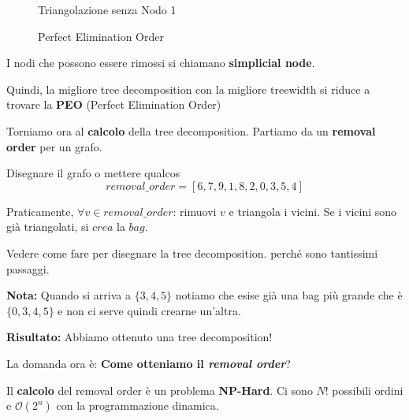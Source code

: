 \begin{definition}
\begin{figure}[H]
\begin{center}
        \end{center}
        \caption{Triangolazione senza Nodo 1}
    \end{figure}

    \begin{figure}[H]
        \begin{center}
        \end{center}
        \caption{Perfect Elimination Order}
    \end{figure}

    I nodi che possono essere rimossi si chiamano \textbf{simplicial node}.

    Quindi, la migliore tree decomposition con la migliore treewidth si riduce a
    trovare la \textbf{PEO} (Perfect Elimination Order)
\end{definition}

Torniamo ora al \textbf{calcolo} della tree decomposition. Partiamo da un
\textbf{removal order} per un grafo.

Disegnare il grafo o mettere qualcos
\[
    removal\_order = [6,7,9,1,8,2,0,3,5,4]
\]

Praticamente, $\forall v \in removal\_order$: rimuovi $v$ e triangola i vicini.
Se i vicini sono già triangolati, si $crea$ la $bag$.

Vedere come fare per disegnare la tree decomposition. perché sono tantissimi
passaggi.

\textbf{Nota:} Quando si arriva a $\{3,4,5\}$ notiamo che esise già una bag più grande che è $\{0,3,4,5\}$ e non ci serve
quindi crearne un'altra.

\textbf{Risultato:} Abbiamo ottenuto una tree decomposition!

La domanda ora è: \textbf{Come otteniamo il \textit{removal order}}?

Il \textbf{calcolo} del removal order è un problema \textbf{NP-Hard}. Ci sono
$N!$ possibili ordini e $\mathcal{O}(2^n)$ con la programmazione dinamica.

